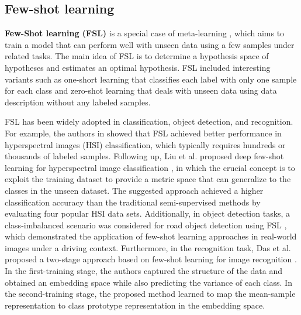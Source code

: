 \documentclass{ieeeaccess}
\begin{document}
\subsection{Few-shot learning}
{\bf Few-Shot learning (FSL)} is a special case of meta-learning \cite{Joaquin2018}, which aims to train a model that can perform well with unseen data using a few samples under related tasks. The main idea of FSL is to determine a hypothesis space of hypotheses and estimates an optimal hypothesis. FSL included interesting variants such as one-short learning \cite{Mark2017, Brenden2011, Fei2006} that classifies each label with only one sample for each class and zero-shot learning \cite{Lampert2013, Larochelle2008, Rohrbach2011, Ding2017} that deals with unseen data using data description without any labeled samples. 

FSL has been widely adopted in classification, object detection, and recognition. For example, the authors in \cite{Dhillon2020, Chen2021} showed that FSL achieved better performance in hyperspectral images (HSI) classification, which typically requires hundreds or thousands of labeled samples. Following up, Liu et al. proposed deep few-shot learning for hyperspectral image classification \cite{Liu2019}, in which the crucial concept is to exploit the training dataset to provide a metric space that can generalize to the classes in the unseen dataset. The suggested approach achieved a higher classification accuracy than the traditional semi-supervised methods by evaluating four popular HSI data sets. 
Additionally, in object detection tasks, a class-imbalanced scenario was considered for road object detection using FSL \cite{Majee2021}, which demonstrated the application of few-shot learning approaches in real-world images under a driving context. Furthermore, in the recognition task, Das et al. proposed a two-stage approach based on few-shot learning for image recognition \cite{Das2019}.  In the first-training
stage, the authors captured the structure
of the data and obtained an embedding space while also predicting the variance of each class. In the second-training stage, the proposed method learned to map the mean-sample representation to class prototype representation in the embedding space.
\end{document}
